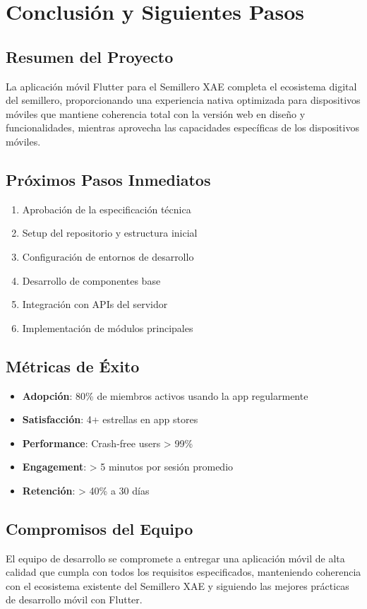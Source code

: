 \documentclass[12pt]{article}
\begin{document}
\section{Conclusión y Siguientes Pasos}
\label{sec:conclusion}

\subsection{Resumen del Proyecto}
La aplicación móvil Flutter para el Semillero XAE completa el ecosistema digital del semillero, proporcionando una experiencia nativa optimizada para dispositivos móviles que mantiene coherencia total con la versión web en diseño y funcionalidades, mientras aprovecha las capacidades específicas de los dispositivos móviles.

\subsection{Próximos Pasos Inmediatos}
\begin{enumerate}
    \item Aprobación de la especificación técnica
    \item Setup del repositorio y estructura inicial
    \item Configuración de entornos de desarrollo
    \item Desarrollo de componentes base
    \item Integración con APIs del servidor
    \item Implementación de módulos principales
\end{enumerate}

\subsection{Métricas de Éxito}
\begin{itemize}
    \item \textbf{Adopción}: 80\% de miembros activos usando la app regularmente
    \item \textbf{Satisfacción}: 4+ estrellas en app stores
    \item \textbf{Performance}: Crash-free users > 99\%
    \item \textbf{Engagement}: > 5 minutos por sesión promedio
    \item \textbf{Retención}: > 40\% a 30 días
\end{itemize}

\subsection{Compromisos del Equipo}
El equipo de desarrollo se compromete a entregar una aplicación móvil de alta calidad que cumpla con todos los requisitos especificados, manteniendo coherencia con el ecosistema existente del Semillero XAE y siguiendo las mejores prácticas de desarrollo móvil con Flutter.
\end{document}
